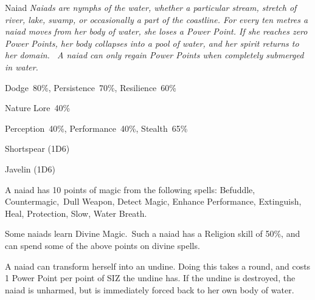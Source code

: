 \newpage

\begin{monsterbox}{Naiad}
	\textit{Naiads are nymphs of the water, whether a particular stream, stretch of river, lake, swamp, or occasionally a part of the coastline. For every ten metres a naiad moves from her body of water, she loses a Power Point. If she reaches zero Power Points, her body collapses into a pool of water, and her spirit returns to her domain.  A naiad can only regain Power Points when completely submerged in water.}\\
	\rpghline
	\basics[%
        hitpoints  = 10, 
	majorwound = 5,
	damagemodifier = 0,
	powerpoints = 25,
	movementrate = 15m,
	armor = None,
	plunderrating = 1
	]
	\rpghline%
	\stats[ %
		STR = 4D6    (14),
		CON = 3D6    (11),
		DEX = 4D6    (14),
		SIZ = 2D6+3  (10),
		INT = 3D6+6  (17),
		POW = 2D6+18 (25),
		CHA = 2D6+12 (19)
	]
	\rpghline%
	\begin{rpg-monsteraction}[Resistances]
		Dodge~80\%, Persistence~70\%, Resilience~60\%
	\end{rpg-monsteraction}
	\begin{rpg-monsteraction}[Knowledge]
		Nature Lore~40\%
	\end{rpg-monsteraction}
	\begin{rpg-monsteraction}[Practical]
		Perception~40\%, Performance~40\%, Stealth~65\%
	\end{rpg-monsteraction}
	\begin{rpg-monsteraction}
		Shortspear (1D6)
	\end{rpg-monsteraction}
	\begin{rpg-monsteraction}
		Javelin (1D6)
	\end{rpg-monsteraction}
	\begin{rpg-monsteraction}[Magic 60\%]
		A naiad has 10 points of magic from the following spells: Befuddle, Countermagic, Dull Weapon, Detect Magic, Enhance Performance, Extinguish, Heal, Protection, Slow, Water Breath.
	\end{rpg-monsteraction}
	\begin{rpg-monsteraction}
		Some naiads learn Divine Magic. Such a naiad has a Religion skill of 50\%, and can spend some of the above points on divine spells.
	\end{rpg-monsteraction}
	\begin{rpg-monsteraction}
		A naiad can transform herself into an undine. Doing this takes a round, and costs 1 Power Point per point of SIZ the undine has. If the undine is destroyed, the naiad is unharmed, but is immediately forced back to her own body of water.
	\end{rpg-monsteraction}

\end{monsterbox}

